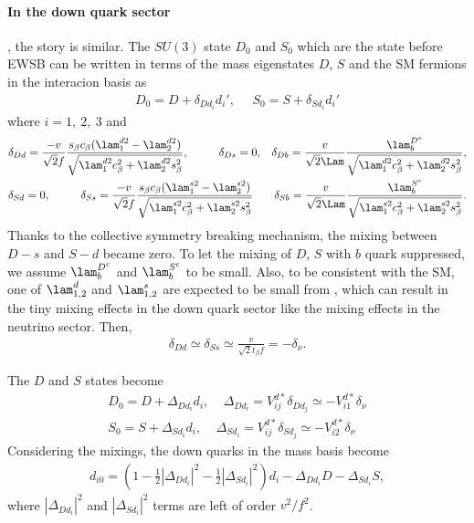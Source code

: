 \paragraph{In the down quark sector}, the story is similar. 
The $SU(3)$ state $D_0$ and $S_0$ which are the state before EWSB can be written in terms of the mass eigenstates $D$, $S$ and the SM fermions
in the interacion basis as 
\begin{align}
 D_0=D+\delta_{Dd_i}d_i', ~~~~~~S_0=S+\delta_{Sd_i} d_i'
\end{align}
where $i=1,~2,~3$ and
\begin{align}
 &\delta_{Dd} =\frac{-v}{\sqrt{2}f}\frac{s_\beta c_\beta (\lam_1^{d2} - \lam_2^{d2} )}{\sqrt{\lam_1^{d2}c_\beta^2 + \lam_2^{d2}s_\beta^2}},~~~~~~~~
 \delta_{Ds}=0,
 &\delta_{Db} =\frac{v}{\sqrt{2}\Lam}\frac{\lam_b^{D^c}}{\sqrt{\lam_1^{d2}c_\beta^2 + \lam_2^{d2}s_\beta^2}},\\ 
 &\delta_{Sd}=0,  ~~~~~~~~
 \delta_{Ss} =\frac{-v}{\sqrt{2}f}\frac{s_\beta c_\beta (\lam_1^{s2} - \lam_2^{s2} )}{\sqrt{\lam_1^{s2}c_\beta^2 + \lam_2^{s2}s_\beta^2}} 
 &\delta_{Sb} =\frac{v}{\sqrt{2}\Lam}\frac{\lam_b^{S^c}}{\sqrt{\lam_1^{s2}c_\beta^2 + \lam_2^{s2}s_\beta^2}}.  
\end{align}
Thanks to the collective symmetry breaking mechanism, the mixing between $D-s$ and $S-d$ became zero. 
To let the mixing of $D$, $S$ with $b$ quark suppressed, we assume $\lam_b^{D^c}$ and $\lam_b^{S^c}$ to be small. 
Also, to be consistent with the SM, one of $\lam_{1,2}^d$ and $\lam_{1,2}^s$ are expected to be small from ,
which can result in the tiny mixing effects in the down quark sector like the mixing effects in the neutrino sector.
Then, \begin{align}
       \delta_{Dd} \simeq \delta_{Ss} \simeq \frac{v}{\sqrt{2}t_\beta f} = -\delta_\nu .
      \end{align}
      

 The $D$      and $S$ states become 
 \begin{align}
  D_0 = D + \Delta_{Dd_i}d_i , ~~~~~ \Delta_{Dd_i}=V_{ij}^{d*} \delta_{Dd_j} \simeq -V_{i1}^{d*} \delta_\nu \nonumber \\
  S_0 = S + \Delta_{Sd_i}d_i , ~~~~~ \Delta_{Sd_i}=V_{ij}^{d*} \delta_{Sd_j} \simeq -V_{i2}^{d*} \delta_\nu 
 \end{align}
 Considering the mixings, the down quarks in the mass basis become 
 \begin{align}
  d_{i0}=(1-\frac{1}{2}|\Delta_{Dd_i}|^2 - \frac{1}{2}|\Delta_{Sd_i}|^2)d_i -\Delta_{Dd_i}D - \Delta_{Sd_i}S, 
 \end{align}
 where $|\Delta_{Dd_i}|^2$ and $|\Delta_{Sd_i}|^2$ terms are left of order $v^2/f^2$. 

